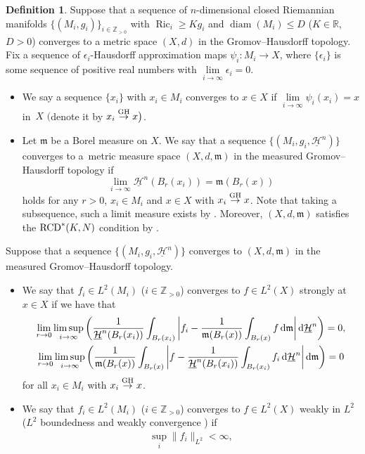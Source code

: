\documentclass[10pt,a4paper]{amsart}
\numberwithin{equation}{section}
\theoremstyle{definition}
\newtheorem{Def}[Thm]{Definition}
\newcommand{\Ric}{\operatorname{Ric}}
\newcommand{\diam}{\operatorname{diam}}
\newcommand{\R}{\mathbb{R}}
\newcommand{\Z}{\mathbb{Z}}
\newcommand{\mf}{\mathfrak{m}}
\newcommand{\RCD}{{\rm RCD}^\ast}
\newcommand{\nHa}{\underline{\mathcal{H}}}
\begin{document}
\begin{Def}
Suppose that a sequence of $n$-dimensional closed Riemannian manifolds $\{(M_i,g_i)\}_{i\in \Z_{>0}}$ with $\Ric_i\geq K g_i$ and $\diam (M_i)\leq D$ ($K\in \R$, $D>0$) converges to a metric space $(X,d)$ in the Gromov--Hausdorff topology.
Fix a sequence of $\epsilon_i$-Hausdorff approximation maps $\psi_i\colon M_i\to X$, where $\{\epsilon_i\}$ is some sequence of positive real numbers with $\lim\limits_{i\to \infty}\epsilon_i=0$.
\begin{itemize}\itemsep=0pt
\item We say a sequence $\{x_i\}$ with $x_i\in M_i$ converges to $x\in X$ if $\lim\limits_{i\to \infty}\psi_i(x_i)= x$ in~$X$ $\big($denote it by $x_i\stackrel{{\rm GH}}{\to} x\big)$.
\item Let $\mf$ be a Borel measure on $X$.
We say that a sequence $\{(M_i,g_i,\nHa^n)\}$ converges to a~metric measure space $(X,d,\mf)$ in the measured Gromov--Hausdorff topology if
\[
\lim_{i\to \infty}\nHa^n(B_r(x_i))=\mf (B_r(x))
\]
holds for any $r>0$, $x_i\in M_i$ and $x\in X$ with $x_i \stackrel{{\rm GH}}{\to} x$.
Note that taking a subsequence, such a limit measure exists by \cite[Theorems~1.6 and~1.10]{CC1}.
Moreover, $(X,d,\mf)$ satisfies the $\RCD(K,N)$ condition by \cite[Theorem~3.22]{EKS}.
\end{itemize}
Suppose that a sequence $\{(M_i,g_i,\nHa^n)\}$ converges to $(X,d,\mf)$ in the measured Gromov--Haus\-dorff topology.
\begin{itemize}\itemsep=0pt
\item We say that $f_i\in L^2(M_i)$ ($i\in\Z_{>0}$) converges to $f\in L^2(X)$ strongly at $x\in X$ \cite[Defi\-nition~3.7]{Ho1} if we have that
\begin{gather*}
\lim_{r\to 0}\limsup_{i\to \infty}\bigg(\frac{1}{\nHa^n(B_r (x_i))}\int_{B_r(x_i)}\bigg|f_i-\frac{1}{\mf(B_r(x))}\int_{B_r(x)}f\,{\rm d}\mf\bigg|\,{\rm d}\nHa^n\bigg)=0,
\\
\lim_{r\to 0}\limsup_{i\to \infty}\bigg(\frac{1}{\mf(B_r (x))}\int_{B_r(x)}\bigg|f-\frac{1}{\nHa^n(B_r(x_i))}\int_{B_r(x_i)}f_i\,{\rm d}\nHa^n\bigg|\,{\rm d}\mf\bigg)=0
\end{gather*}
for all $x_i\in M_i$ with $x_i \stackrel{{\rm GH}}{\to} x$.
\item We say that $f_i\in L^2(M_i)$ ($i\in\Z_{>0}$) converges to $f\in L^2(X)$ weakly in $L^2$ ($L^2$ boundedness and weakly convergence \cite[Definition~3.4 and~Proposition~3.17]{Ho1}) if
\begin{gather*}
\sup_{i}\|f_i\|_{L^2}<\infty,

\end{gather*}
\end{itemize}
\end{Def}
\end{document}
